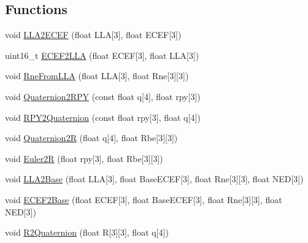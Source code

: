 \subsection*{\-Functions}
\begin{DoxyCompactItemize}
\item 
void \hyperlink{group___tau_labs_math_ga362aa95352aa40af9d1d23ac12f83a49}{\-L\-L\-A2\-E\-C\-E\-F} (float \-L\-L\-A\mbox{[}3\mbox{]}, float \-E\-C\-E\-F\mbox{[}3\mbox{]})
\item 
uint16\-\_\-t \hyperlink{group___tau_labs_math_gade2c2cec4a9e1098f5b8f3c4b5987552}{\-E\-C\-E\-F2\-L\-L\-A} (float \-E\-C\-E\-F\mbox{[}3\mbox{]}, float \-L\-L\-A\mbox{[}3\mbox{]})
\item 
void \hyperlink{group___tau_labs_math_ga682c71aaf24cb8f77a2452e027daaff2}{\-Rne\-From\-L\-L\-A} (float \-L\-L\-A\mbox{[}3\mbox{]}, float \-Rne\mbox{[}3\mbox{]}\mbox{[}3\mbox{]})
\item 
void \hyperlink{group___tau_labs_math_ga0e4bc4f44a08a2e317db0bde882909cc}{\-Quaternion2\-R\-P\-Y} (const float q\mbox{[}4\mbox{]}, float rpy\mbox{[}3\mbox{]})
\item 
void \hyperlink{group___tau_labs_math_ga81a64437be6edb2654bfebcc14321964}{\-R\-P\-Y2\-Quaternion} (const float rpy\mbox{[}3\mbox{]}, float q\mbox{[}4\mbox{]})
\item 
void \hyperlink{group___tau_labs_math_gaccaead20abfe7057c1a086b5426865df}{\-Quaternion2\-R} (float q\mbox{[}4\mbox{]}, float \-Rbe\mbox{[}3\mbox{]}\mbox{[}3\mbox{]})
\item 
void \hyperlink{group___tau_labs_math_ga33c35c48faebb53d4d2cd46b67aba8ff}{\-Euler2\-R} (float rpy\mbox{[}3\mbox{]}, float \-Rbe\mbox{[}3\mbox{]}\mbox{[}3\mbox{]})
\item 
void \hyperlink{group___tau_labs_math_ga286e15f43ea9091854744369470fed6d}{\-L\-L\-A2\-Base} (float \-L\-L\-A\mbox{[}3\mbox{]}, float \-Base\-E\-C\-E\-F\mbox{[}3\mbox{]}, float \-Rne\mbox{[}3\mbox{]}\mbox{[}3\mbox{]}, float \-N\-E\-D\mbox{[}3\mbox{]})
\item 
void \hyperlink{group___tau_labs_math_ga3900fb782ab3f56ea2dad005610f2ffe}{\-E\-C\-E\-F2\-Base} (float \-E\-C\-E\-F\mbox{[}3\mbox{]}, float \-Base\-E\-C\-E\-F\mbox{[}3\mbox{]}, float \-Rne\mbox{[}3\mbox{]}\mbox{[}3\mbox{]}, float \-N\-E\-D\mbox{[}3\mbox{]})
\item 
void \hyperlink{group___tau_labs_math_gad6008216daaf402435c742d0290f9a30}{\-R2\-Quaternion} (float \-R\mbox{[}3\mbox{]}\mbox{[}3\mbox{]}, float q\mbox{[}4\mbox{]})
\item 

\end{DoxyCompactItemize}
